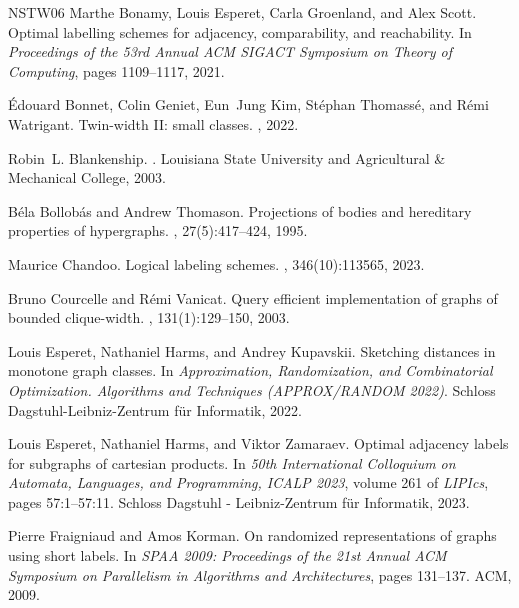 \documentclass[letterpaper,11pt]{article}
\theoremstyle{definition}
\theoremstyle{remark}
\begin{document}
\begin{thebibliography}{NSTW06}
Marthe Bonamy, Louis Esperet, Carla Groenland, and Alex Scott.
\newblock Optimal labelling schemes for adjacency, comparability, and
  reachability.
\newblock In {\em Proceedings of the 53rd Annual ACM SIGACT Symposium on Theory
  of Computing}, pages 1109--1117, 2021.

{\'E}douard Bonnet, Colin Geniet, Eun~Jung Kim, St\'ephan Thomass\'e, and
  R\'emi Watrigant.
\newblock Twin-width {II}: small classes.
, 2022.

Robin~L. Blankenship.
.
\newblock Louisiana State University and Agricultural \& Mechanical College,
  2003.

B{\'e}la Bollob{\'a}s and Andrew Thomason.
\newblock Projections of bodies and hereditary properties of hypergraphs.
, 27(5):417--424,
  1995.

Maurice Chandoo.
\newblock Logical labeling schemes.
, 346(10):113565, 2023.

Bruno Courcelle and R{\'e}mi Vanicat.
\newblock Query efficient implementation of graphs of bounded clique-width.
, 131(1):129--150, 2003.

Louis Esperet, Nathaniel Harms, and Andrey Kupavskii.
\newblock Sketching distances in monotone graph classes.
\newblock In {\em Approximation, Randomization, and Combinatorial Optimization.
  Algorithms and Techniques (APPROX/RANDOM 2022)}. Schloss
  Dagstuhl-Leibniz-Zentrum f{\"u}r Informatik, 2022.

Louis Esperet, Nathaniel Harms, and Viktor Zamaraev.
\newblock Optimal adjacency labels for subgraphs of cartesian products.
\newblock In {\em 50th International Colloquium on Automata, Languages, and
  Programming, {ICALP} 2023}, volume 261 of {\em LIPIcs}, pages 57:1--57:11.
  Schloss Dagstuhl - Leibniz-Zentrum f{\"{u}}r Informatik, 2023.

Pierre Fraigniaud and Amos Korman.
\newblock On randomized representations of graphs using short labels.
\newblock In {\em {SPAA} 2009: Proceedings of the 21st Annual {ACM} Symposium
  on Parallelism in Algorithms and Architectures}, pages 131--137. {ACM}, 2009.


\end{thebibliography}
\end{document}
